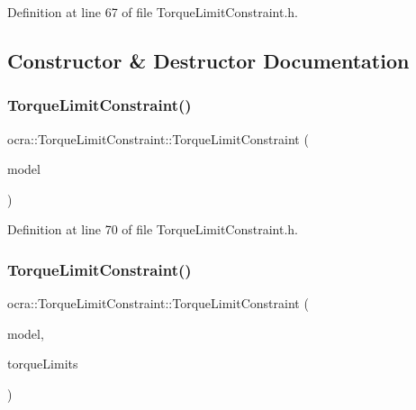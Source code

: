 Definition at line 67 of file Torque\+Limit\+Constraint.\+h.



\subsection{Constructor \& Destructor Documentation}
\hypertarget{classocra_1_1TorqueLimitConstraint_ac1d452a8e42d05489ab0b16c9abbba0b}{}\label{classocra_1_1TorqueLimitConstraint_ac1d452a8e42d05489ab0b16c9abbba0b} 
\subsubsection{\texorpdfstring{Torque\+Limit\+Constraint()}{TorqueLimitConstraint()}\hspace{0.1cm}{\footnotesize\ttfamily [1/2]}}
{\footnotesize\ttfamily ocra\+::\+Torque\+Limit\+Constraint\+::\+Torque\+Limit\+Constraint (\begin{DoxyParamCaption}\item[{const Model \&}]{model }\end{DoxyParamCaption})\hspace{0.3cm}{\ttfamily [inline]}}



Definition at line 70 of file Torque\+Limit\+Constraint.\+h.

\hypertarget{classocra_1_1TorqueLimitConstraint_adf43adabb40dc149d609b219fe8b7ac0}{}\label{classocra_1_1TorqueLimitConstraint_adf43adabb40dc149d609b219fe8b7ac0} 
\subsubsection{\texorpdfstring{Torque\+Limit\+Constraint()}{TorqueLimitConstraint()}\hspace{0.1cm}{\footnotesize\ttfamily [2/2]}}
{\footnotesize\ttfamily ocra\+::\+Torque\+Limit\+Constraint\+::\+Torque\+Limit\+Constraint (\begin{DoxyParamCaption}\item[{const Model \&}]{model,  }\item[{const Eigen\+::\+Vector\+Xd \&}]{torque\+Limits }\end{DoxyParamCaption})\hspace{0.3cm}{\ttfamily [inline]}}



